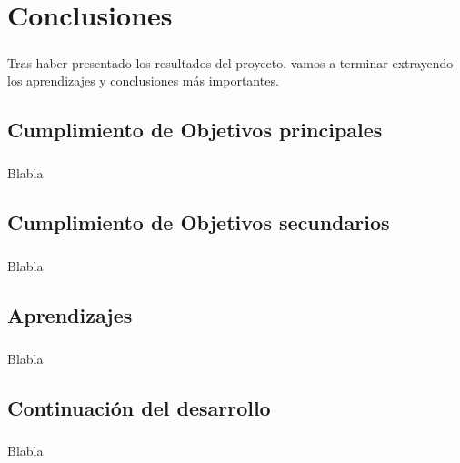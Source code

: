 \chapter{Conclusiones}\label{sec:conclusiones}

\paragraph{}Tras haber presentado los resultados del proyecto, vamos a terminar extrayendo
los aprendizajes y conclusiones más importantes.

\section{Cumplimiento de Objetivos principales}

\paragraph{}Blabla

\section{Cumplimiento de Objetivos secundarios}

\paragraph{}Blabla

\section{Aprendizajes}

\paragraph{}Blabla

\section{Continuación del desarrollo}

\paragraph{}Blabla

